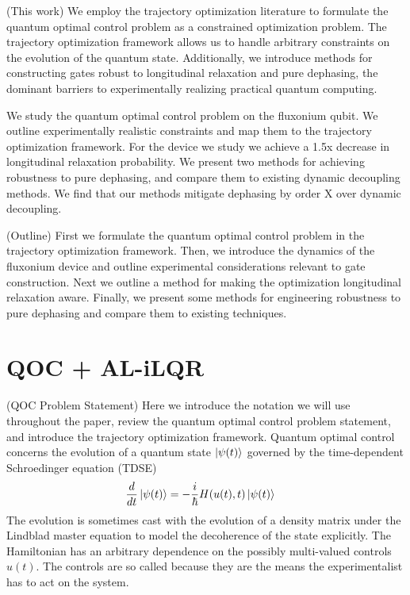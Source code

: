 \documentclass[
  amsfonts,
  amsmath,
  tbtags,
  amssymb,
  aps,
  nobibnotes,
  twocolumn,
]{revtex4-2}
\begin{document}
(This work) We employ the trajectory optimization
literature to formulate the quantum
optimal control problem as a constrained optimization problem.
The trajectory optimization framework allows us to handle arbitrary
constraints on the evolution of the quantum state. Additionally,
we introduce methods for constructing gates robust to longitudinal
relaxation and pure dephasing, the dominant barriers to experimentally
realizing practical quantum computing.

We study the quantum optimal control problem on the fluxonium qubit.
We outline experimentally realistic constraints and map them to
the trajectory optimization framework. For the device we study
we achieve a 1.5x decrease in longitudinal relaxation probability.
We present two methods for achieving robustness to pure dephasing,
and compare them to existing dynamic decoupling methods. We find that 
our methods mitigate dephasing by order X over dynamic decoupling.

(Outline)  First we formulate the quantum optimal control problem
in the trajectory optimization framework. Then, we introduce the dynamics
of the fluxonium device and outline experimental considerations
relevant to gate construction. Next we outline a method for
making the optimization longitudinal relaxation aware. Finally, we present
some methods for engineering robustness to pure dephasing and
compare them to existing techniques.


\section{QOC + AL-iLQR}
(QOC Problem Statement) Here we introduce the notation
we will use throughout the paper,
review the quantum optimal control problem statement,
and introduce the trajectory optimization framework.
Quantum optimal control concerns the evolution of
a quantum state $\ket{\psi(t)}$ governed by the time-dependent
Schroedinger equation (TDSE)
\label{eq:tdse}
\begin{align}
  \frac{d}{dt} \ket{\psi(t)} &= -\frac{i}{\hbar} H(u(t), t) \ket{\psi(t)}
\end{align}
The evolution is sometimes cast with the evolution
of a density matrix under the Lindblad master equation to
model the decoherence of the state explicitly. The Hamiltonian
has an arbitrary dependence on the possibly multi-valued controls $u(t)$.
The controls are so called because they are the means the experimentalist has to
act on the system.
\end{document}

